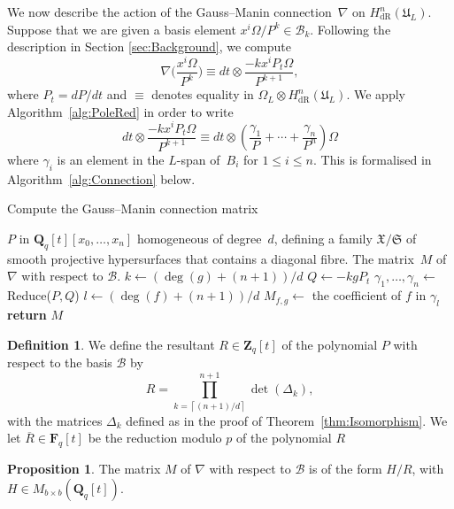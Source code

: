 \documentclass[a4paper,11pt]{article}
\numberwithin{equation}{section}
\providecommand{\ceil}[1]{\left\lceil#1\right\rceil}   %
\newcommand{\ZZ}{\mathbf{Z}} %
\newcommand{\QQ}{\mathbf{Q}} %
\newcommand{\FF}{\mathbf{F}} %
\providecommand{\HdR}{H_{\text{dR}}}    %
\providecommand{\cB}{\mathcal{B}} %
\theoremstyle{definition}
\newtheorem{prop}[thm]{Proposition}
\newtheorem{defn}[thm]{Definition}
\begin{document}
We now describe the action of the Gauss--Manin connection~$\nabla$ on 
$\HdR^n(\mathfrak{U}_L)$.  Suppose that we are given a basis element 
$x^i \Omega / P^k \in \cB_k$.  Following the description in Section \ref{sec:Background}, 
we compute
\begin{equation} \label{eqn:nabla}
\nabla \biggl(\frac{x^i \Omega}{P^k}\biggr) \equiv 
dt \otimes \frac{- k x^i P_t \Omega}{P^{k+1}},
\end{equation}
where $P_t = dP/dt$ and $\equiv$ denotes equality in 
$\Omega_{L} \otimes \HdR^n(\mathfrak{U}_L)$. We apply 
Algorithm~\ref{alg:PoleRed} in order to write
\begin{equation}
dt \otimes \frac{- k x^i P_t \Omega}{P^{k+1}} \equiv 
dt \otimes \left( \frac{\gamma_{1}}{P} + \dotsb + \frac{\gamma_n}{P^n} \right) \Omega
\end{equation}
where $\gamma_i$ is an element in the $L$-span of~$B_i$ for $1 \leq i \leq n$. This is
formalised in Algorithm~\ref{alg:Connection} below.

\begin{algorithm}
\caption{Compute the Gauss--Manin connection matrix}
\label{alg:Connection}
\begin{algorithmic}
\Require $P$ in $\QQ_q[t][x_0, \dotsc, x_n]$ homogeneous of degree~$d$, 
         defining a family $\mathfrak{X}/\mathfrak{S}$ of smooth projective 
         hypersurfaces that contains a diagonal fibre.
\Ensure  The matrix~$M$ of $\nabla$ with respect to $\cB$.
\State $k \gets  (\deg(g)+(n+1))/d$
\State $Q \gets  - k g P_t$
\State $\gamma_{1}, \dotsc, \gamma_n \gets$
      {\sc Reduce($P,Q$)} 
\State $l \gets (\deg(f)+(n+1))/d$
\State $M_{f,g} \gets$ the coefficient of $f$ in $\gamma_l$
\EndFor
\EndFor
\textbf{return} $M$
\EndProcedure
\end{algorithmic}
\end{algorithm}

\begin{defn} \label{defn:resultant}
We define the resultant $R \in \ZZ_q[t]$ of the polynomial $P$ with respect to the
basis $\cB$ by
\[
R = \prod_{k=\ceil{(n+1)/d}}^{n+1}  \det(\Delta_k),
\]
with the matrices $\Delta_k$ defined as in the proof of Theorem~\ref{thm:Isomorphism}. 
We let $\overline{R} \in \FF_q[t]$ be the reduction modulo $p$ of the polynomial $R$
\end{defn}

\begin{prop} \label{thm:denom}
The matrix $M$ of $\nabla$ with respect to $\cB$ is of the form
$H/R$, with $H \in M_{b \times b}(\QQ_q[t])$.
\end{prop}
\end{document}
